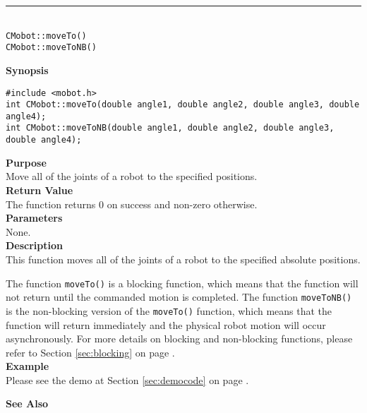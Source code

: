\noindent
\vspace{5pt}
\rule{4.5in}{0.015in}\\
\noindent
{\LARGE \texttt{CMobot::moveTo()}}\\
{\LARGE \texttt{CMobot::moveToNB()}}\\
{}

\noindent
{\bf Synopsis}
\vspace{-8pt}
\begin{verbatim}
#include <mobot.h>
int CMobot::moveTo(double angle1, double angle2, double angle3, double angle4);
int CMobot::moveToNB(double angle1, double angle2, double angle3, double angle4);
\end{verbatim}

\noindent
{\bf Purpose}\\
Move all of the joints of a robot to the specified positions.\\

\noindent
{\bf Return Value}\\
The function returns 0 on success and non-zero otherwise.\\

\noindent
{\bf Parameters}\\
None.\\

\noindent
{\bf Description}\\
This function moves all of the joints of a robot to the specified absolute positions. 

The function \texttt{moveTo()} is a blocking function, which means that 
the function will not return until the commanded motion is 
completed. The function \texttt{moveToNB()} is the non-blocking version of
the \texttt{moveTo()} function, which means that the function will return
immediately and the physical robot motion will occur asynchronously. For
more details on blocking and non-blocking functions, please refer to 
Section \ref{sec:blocking} on page \pageref{sec:blocking}.\\

\noindent
{\bf Example}\\
Please see the demo at Section \ref{sec:democode} on page \pageref{sec:democode}.\\
\noindent

\noindent
{\bf See Also}\\

